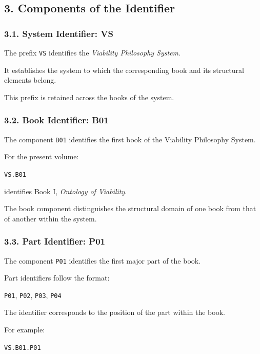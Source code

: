 \subsection*{3. Components of the Identifier}

\subsubsection*{3.1. System Identifier: VS}

The prefix \texttt{VS} identifies the
\textit{Viability Philosophy System}.

It establishes the system to which the
corresponding book and its structural
elements belong.

This prefix is retained across the books
of the system.

\subsubsection*{3.2. Book Identifier: B01}

The component \texttt{B01} identifies
the first book of the Viability Philosophy
System.

For the present volume:

\begin{center}
    \texttt{VS.B01}
\end{center}

identifies Book I, \textit{Ontology of
Viability}.

The book component distinguishes the
structural domain of one book from that
of another within the system.

\subsubsection*{3.3. Part Identifier: P01}

The component \texttt{P01} identifies
the first major part of the book.

Part identifiers follow the format:

\begin{center}
    \texttt{P01}, \texttt{P02},
    \texttt{P03}, \texttt{P04}
\end{center}

The identifier corresponds to the
position of the part within the book.

For example:

\begin{center}
    \texttt{VS.B01.P01}
\end{center}

